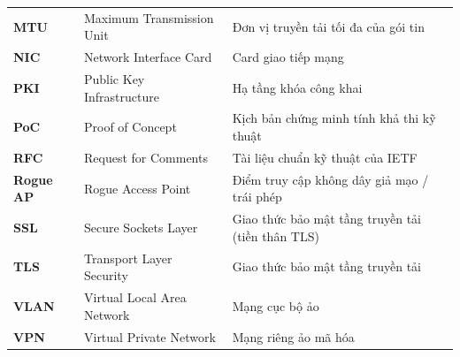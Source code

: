 \begin{xltabular}{\textwidth}{l l L}
\textbf{MTU} & Maximum Transmission Unit & Đơn vị truyền tải tối đa của gói tin \\
\textbf{NIC} & Network Interface Card & Card giao tiếp mạng \\
\textbf{PKI} & Public Key Infrastructure & Hạ tầng khóa công khai \\
\textbf{PoC} & Proof of Concept & Kịch bản chứng minh tính khả thi kỹ thuật \\
\textbf{RFC} & Request for Comments & Tài liệu chuẩn kỹ thuật của IETF \\
\textbf{Rogue AP} & Rogue Access Point & Điểm truy cập không dây giả mạo / trái phép \\
\textbf{SSL} & Secure Sockets Layer & Giao thức bảo mật tầng truyền tải (tiền thân TLS) \\
\textbf{TLS} & Transport Layer Security & Giao thức bảo mật tầng truyền tải \\
\textbf{VLAN} & Virtual Local Area Network & Mạng cục bộ ảo \\
\textbf{VPN} & Virtual Private Network & Mạng riêng ảo mã hóa \\
\bottomrule
\end{xltabular}
